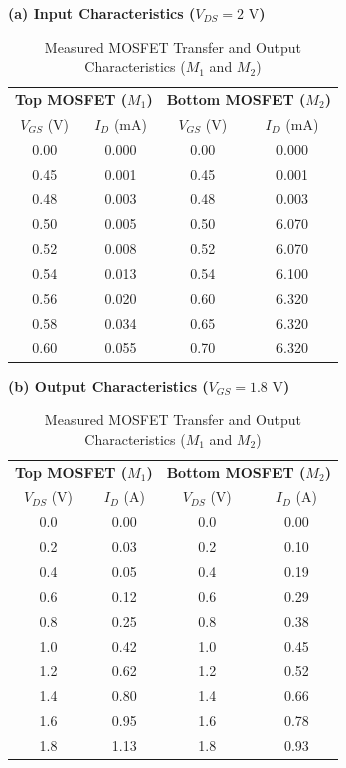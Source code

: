 \documentclass[11pt,a4paper]{article}
\begin{document}
\begin{table}[H]
\centering
\caption{Measured MOSFET Transfer and Output Characteristics ($M_1$ and $M_2$)}
\begin{minipage}[t]{0.48\textwidth}
\centering
\textbf{(a) Input Characteristics ($V_{DS} = 2\text{ V}$)}
\vspace{0.15cm}
\begin{tabular}{@{}cccc@{}}
\toprule
\multicolumn{2}{c}{\textbf{Top MOSFET ($M_1$)}} & \multicolumn{2}{c}{\textbf{Bottom MOSFET ($M_2$)}} \\
$V_{GS}$ (V) & $I_D$ (mA) & $V_{GS}$ (V) & $I_D$ (mA) \\ \midrule
0.00 & 0.000 & 0.00 & 0.000 \\
0.45 & 0.001 & 0.45 & 0.001 \\
0.48 & 0.003 & 0.48 & 0.003 \\
0.50 & 0.005 & 0.50 & 6.070 \\
0.52 & 0.008 & 0.52 & 6.070 \\
0.54 & 0.013 & 0.54 & 6.100 \\
0.56 & 0.020 & 0.60 & 6.320 \\
0.58 & 0.034 & 0.65 & 6.320 \\
0.60 & 0.055 & 0.70 & 6.320 \\
\bottomrule
\end{tabular}
\end{minipage}
\hfill
\begin{minipage}[t]{0.48\textwidth}
\centering
\textbf{(b) Output Characteristics ($V_{GS} = 1.8\text{ V}$)}
\vspace{0.15cm}
\begin{tabular}{@{}cccc@{}}
\toprule
\multicolumn{2}{c}{\textbf{Top MOSFET ($M_1$)}} & \multicolumn{2}{c}{\textbf{Bottom MOSFET ($M_2$)}} \\
$V_{DS}$ (V) & $I_D$ (A) & $V_{DS}$ (V) & $I_D$ (A) \\ \midrule
0.0 & 0.00 & 0.0 & 0.00 \\
0.2 & 0.03 & 0.2 & 0.10 \\
0.4 & 0.05 & 0.4 & 0.19 \\
0.6 & 0.12 & 0.6 & 0.29 \\
0.8 & 0.25 & 0.8 & 0.38 \\
1.0 & 0.42 & 1.0 & 0.45 \\
1.2 & 0.62 & 1.2 & 0.52 \\
1.4 & 0.80 & 1.4 & 0.66 \\
1.6 & 0.95 & 1.6 & 0.78 \\
1.8 & 1.13 & 1.8 & 0.93 \\
\bottomrule
\end{tabular}
\end{minipage}
\end{table}
\end{document}
